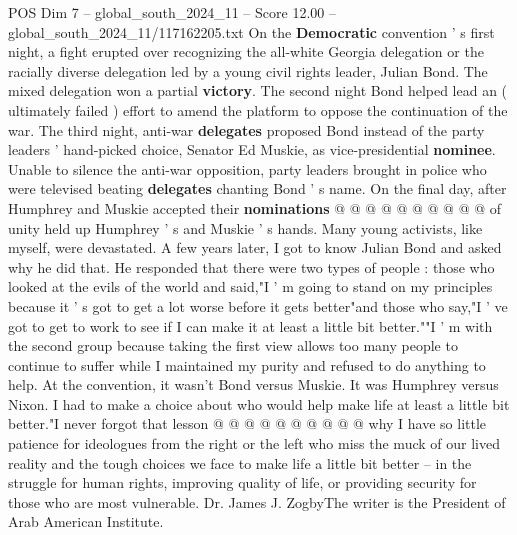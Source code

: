 \begin{textsample}{POS Dim 7 – global\_south\_2024\_11 – Score 12.00 – global\_south\_2024\_11/117162205.txt}
On the \textbf{Democratic} convention ' s first night, a fight erupted over recognizing the all-white Georgia delegation or the racially diverse delegation led by a young civil rights leader, Julian Bond.
The mixed delegation won a partial \textbf{victory}.
The second night Bond helped lead an ( ultimately failed ) effort to amend the platform to oppose the continuation of the war.
The third night, anti-war \textbf{delegates} proposed Bond instead of the party leaders ' hand-picked choice, Senator Ed Muskie, as vice-presidential \textbf{nominee}.
Unable to silence the anti-war opposition, party leaders brought in police who were televised beating \textbf{delegates} chanting Bond ' s name.
On the final day, after Humphrey and Muskie accepted their \textbf{nominations} @ @ @ @ @ @ @ @ @ @ of unity held up Humphrey ' s and Muskie ' s hands.
Many young activists, like myself, were devastated.
A few years later, I got to know Julian Bond and asked why he did that.
He responded that there were two types of people : those who looked at the evils of the world and said,"I ' m going to stand on my principles because it ' s got to get a lot worse before it gets better"and those who say,"I ' ve got to get to work to see if I can make it at least a little bit better.""I ' m with the second group because taking the first view allows too many people to continue to suffer while I maintained my purity and refused to do anything to help.
At the convention, it wasn't Bond versus Muskie.
It was Humphrey versus Nixon.
I had to make a choice about who would help make life at least a little bit better."I never forgot that lesson @ @ @ @ @ @ @ @ @ @ why I have so little patience for ideologues from the right or the left who miss the muck of our lived reality and the tough choices we face to make life a little bit better -- in the struggle for human rights, improving quality of life, or providing security for those who are most vulnerable.
Dr.
James J.
ZogbyThe writer is the President of Arab American Institute.

\end{textsample}

